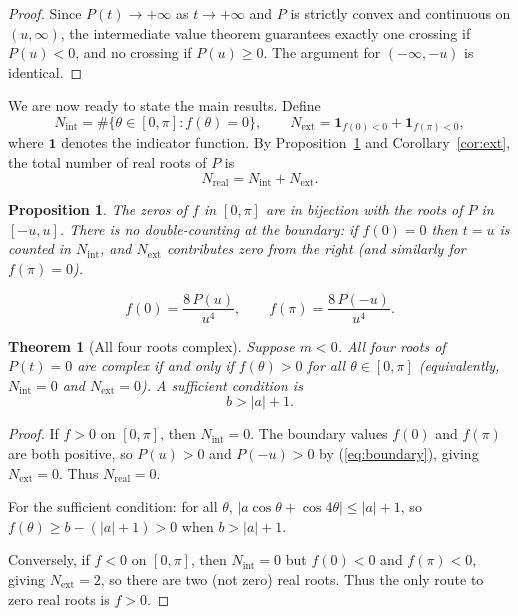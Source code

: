 \documentclass[10pt,a4paper]{amsart}
\newtheorem{theorem}{Theorem}
\newtheorem{proposition}{Proposition}
\begin{document}
\begin{proof}
Since $P(t) \to +\infty$ as $t \to +\infty$ and $P$ is strictly convex and continuous on $(u, \infty)$, the intermediate value theorem guarantees exactly one crossing if $P(u) < 0$, and no crossing if $P(u) \geq 0$. The argument for $(-\infty, -u)$ is identical.
\end{proof}

We are now ready to state the main results. Define
\[
N_{\mathrm{int}} = \#\{\theta \in [0,\pi] : f(\theta) = 0\}, \qquad N_{\mathrm{ext}} = \mathbf{1}_{f(0)<0} + \mathbf{1}_{f(\pi)<0},
\]
where $\mathbf{1}$ denotes the indicator function. By Proposition~\ref{prop:bijection_formal} and Corollary~\ref{cor:ext}, the total number of real roots of $P$ is
\begin{equation}\label{eq:Nreal}
N_{\mathrm{real}} = N_{\mathrm{int}} + N_{\mathrm{ext}}.
\end{equation}

\begin{proposition}\label{prop:bijection_formal}
The zeros of $f$ in $[0,\pi]$ are in bijection with the roots of $P$ in $[-u,u]$. There is no double-counting at the boundary: if $f(0) = 0$ then $t = u$ is counted in $N_{\mathrm{int}}$, and $N_{\mathrm{ext}}$ contributes zero from the right (and similarly for $f(\pi) = 0$).
\end{proposition}

\begin{equation}\label{eq:boundary}
f(0) = \frac{8\,P(u)}{u^4}, \qquad f(\pi) = \frac{8\,P(-u)}{u^4}.
\end{equation}

\begin{theorem}[All four roots complex]\label{thm:four_complex}
Suppose $m < 0$. All four roots of $P(t) = 0$ are complex if and only if $f(\theta) > 0$ for all $\theta \in [0,\pi]$ (equivalently, $N_{\mathrm{int}} = 0$ and $N_{\mathrm{ext}} = 0$). A sufficient condition is
\begin{equation}\label{eq:four_complex_suff}
b > |a| + 1.
\end{equation}
\end{theorem}

\begin{proof}
If $f > 0$ on $[0,\pi]$, then $N_{\mathrm{int}} = 0$. The boundary values $f(0)$ and $f(\pi)$ are both positive, so $P(u) > 0$ and $P(-u) > 0$ by (\ref{eq:boundary}), giving $N_{\mathrm{ext}} = 0$. Thus $N_{\mathrm{real}} = 0$.

For the sufficient condition: for all $\theta$, $|a\cos\theta + \cos 4\theta| \leq |a| + 1$, so $f(\theta) \geq b - (|a|+1) > 0$ when $b > |a| + 1$.

Conversely, if $f < 0$ on $[0,\pi]$, then $N_{\mathrm{int}} = 0$ but $f(0) < 0$ and $f(\pi) < 0$, giving $N_{\mathrm{ext}} = 2$, so there are two (not zero) real roots. Thus the only route to zero real roots is $f > 0$.
\end{proof}
\end{document}
